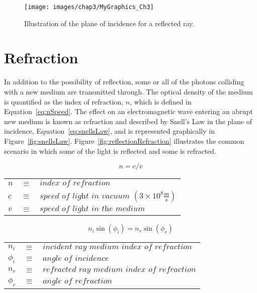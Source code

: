 \begin{figure}[htb]		%
\centering
\texttt{[image: images/chap3/MyGraphics\_Ch3]}
\caption{Illustration of the plane of incidence for a reflected ray.}
\label{fig:planeOfIncidence}
\end{figure}


\section{Refraction}
\label{sec:refraction}
In addition to the possibility of reflection, some or all of the photons colliding with a new medium are transmitted through. The optical density of the medium is quantified as the index of refraction, $n$, which is defined in Equation~\eqref{eq:nSpeed}. The effect on an electromagnetic wave entering an abrupt new medium is known as refraction and described by Snell's Law in the plane of incidence, Equation~\eqref{eq:snellsLaw}, and is represented graphically in Figure~\ref{fig:snellsLaw}. Figure~\ref{fig:reflectionRefraction} illustrates the common scenario in which some of the light is reflected and some is refracted. 


\begin{table}		%
\centering
\begin{equation}		%
n = c/v
\label{eq:nSpeed}
\end{equation}
\begin{tabular}{lll}
$n$ & $\equiv$ & $\textit{index of refraction}$\\
$c$ & $\equiv$ & $\textit{speed of light in vacuum } \mathrm{(3{\times}10^8\frac{\textrm{m}}{\textrm{s}})}$\\
$v$ & $\equiv$ & $\textit{speed of light in the medium}$
\end{tabular}
\end{table}

\begin{table}		%
\centering
\begin{equation}		%
n_i\sin{(\phi_i)} = n_r\sin{(\phi_r)}
\label{eq:snellsLaw}
\end{equation}
\begin{tabular}{lll}
$n_i$ & $\equiv$ & $\textit{incident ray medium index of refraction}$\\
$\phi_i$ & $\equiv$ & $\textit{angle of incidence}$\\
$n_r$ & $\equiv$ & $\textit{refracted ray medium index of refraction}$\\
$\phi_r$ & $\equiv$ & $\textit{angle of refraction}$
\end{tabular}
\end{table}


